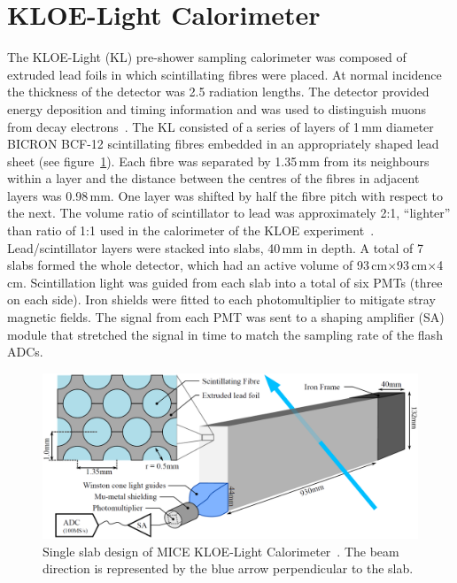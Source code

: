 \graphicspath{ {04-KL/Figures/} }

\section{KLOE-Light Calorimeter}
\label{Sect:KL}

The KLOE-Light (KL) pre-shower sampling calorimeter was composed of
extruded lead foils in which scintillating fibres were placed.
At normal incidence the thickness of the detector was 2.5 radiation
lengths.
The detector provided energy deposition and timing information and was
used to distinguish muons from decay
electrons~\cite{2016JInst..11P3001A}.
The KL consisted of a series of layers of 1\,mm diameter BICRON BCF-12
scintillating fibres embedded in an appropriately shaped lead sheet
(see figure~\ref{fig:KL2}).
Each fibre was separated by 1.35\,mm from its neighbours within a
layer and the distance between the centres of the fibres in adjacent
layers was 0.98\,mm.
One layer was shifted by half the fibre pitch with respect to the next.
The volume ratio of scintillator to lead was approximately 2:1,
``lighter'' than ratio of 1:1 used in the calorimeter of the KLOE
experiment~\cite{Ambrosino:2009zza}. 
Lead/scintillator layers were stacked into slabs, 40\,mm in depth.
A total of 7 slabs formed the whole detector, which had an active
volume of 93\,cm$\times$93\,cm$\times$4\,cm.
Scintillation light was guided from each slab into a total of six PMTs
(three on each side).
Iron shields were fitted to each photomultiplier to mitigate stray magnetic fields.
The signal from each PMT was sent to a shaping amplifier (SA) module
that stretched the signal in time to match the sampling rate
of the flash ADCs. \\
\begin{figure}
  \begin{center}
    \includegraphics[width=0.8\columnwidth]{./04-KL/Figures/KL2_with_beam.png}
    \caption{Single slab design of MICE KLOE-Light Calorimeter~\cite{Overton:2014tka}.
    The beam direction is represented by the blue arrow perpendicular to the slab.
    }
    \label{fig:KL2}
  \end{center}
\end{figure}

